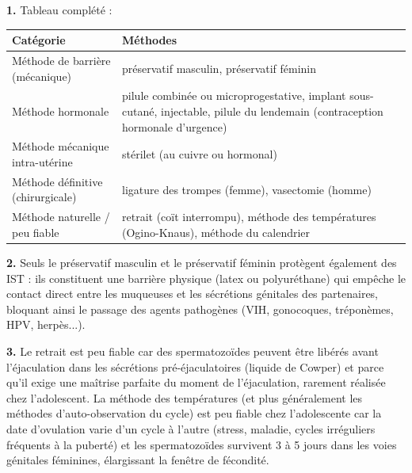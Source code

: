 \documentclass[11pt]{article}
\newcommand{\cle}[1]{{\popxbold\color{popdark}#1}}
\begin{document}
\begin{corrige}

\textbf{1.} Tableau complété :

\begin{center}
\begin{tabularx}{\linewidth}{|l|X|}
\hline
\rowcolor{popblueL} \textbf{Catégorie} & \textbf{Méthodes} \\
\hline
Méthode de barrière (mécanique) & préservatif masculin, préservatif féminin \\
\hline
Méthode hormonale & pilule combinée ou microprogestative, implant sous-cutané, injectable, pilule du lendemain (contraception hormonale d'urgence) \\
\hline
Méthode mécanique intra-utérine & stérilet (au cuivre ou hormonal) \\
\hline
Méthode définitive (chirurgicale) & ligature des trompes (femme), vasectomie (homme) \\
\hline
Méthode naturelle / peu fiable & retrait (coït interrompu), méthode des températures (Ogino-Knaus), méthode du calendrier \\
\hline
\end{tabularx}
\end{center}

\textbf{2.} Seuls le \cle{préservatif masculin} et le \cle{préservatif féminin} protègent également des IST : ils constituent une barrière physique (latex ou polyuréthane) qui empêche le contact direct entre les muqueuses et les sécrétions génitales des partenaires, bloquant ainsi le passage des agents pathogènes (VIH, gonocoques, tréponèmes, HPV, herpès...).

\textbf{3.} Le retrait est peu fiable car des spermatozoïdes peuvent être libérés avant l'éjaculation dans les sécrétions pré-éjaculatoires (liquide de Cowper) et parce qu'il exige une maîtrise parfaite du moment de l'éjaculation, rarement réalisée chez l'adolescent. La méthode des températures (et plus généralement les méthodes d'auto-observation du cycle) est peu fiable chez l'adolescente car la date d'ovulation varie d'un cycle à l'autre (stress, maladie, cycles irréguliers fréquents à la puberté) et les spermatozoïdes survivent 3 à 5 jours dans les voies génitales féminines, élargissant la fenêtre de fécondité.
\end{corrige}
\end{document}
